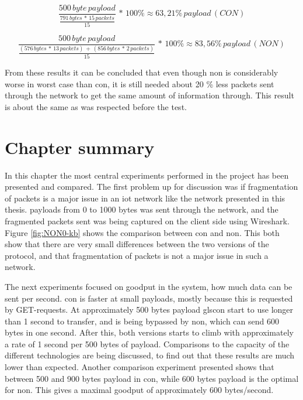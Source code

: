 \begin{equation} \label{bestWorstEquation}
	\frac{500 \, byte \, payload}{\frac{791 \, bytes \,*\, 15 \, packets}{15}}\,*\,100 \% \approx 63,21 \%\, payload \, (CON)
\end{equation}

\begin{equation} \label{bestWorstEquation2}
\frac{500\, byte\, payload}{\frac{(576\, bytes\, *\, 13\, packets)\,+\,(856\, bytes\, *\, 2 \,packets)}{15}}\,*\,100 \% \approx 83,56 \%\, payload \, (NON)
\end{equation}

\noindent From these results it can be concluded that even though \gls{non} is considerably worse in worst case than \gls{con}, it is still needed about 20 \% less packets sent through the network to get the same amount of information through. This result is about the same as was respected before the test. 



\section{Chapter summary}

\noindent In this chapter the most central experiments performed in the project has been presented and compared. The first problem up for discussion was if fragmentation of packets is a major issue in an \gls{iot} network like the network presented in this thesis. \Glspl{payload} from 0 to 1000 bytes was sent through the network, and the fragmented packets sent was being captured on the client side using Wireshark. Figure \ref{fig:NON0-kb} shows the comparison between \gls{con} and \gls{non}. This both show that there are very small differences between the two versions of the protocol, and that fragmentation of packets is not a major issue in such a network. 

\noindent The next experiments focused on \gls{goodput} in the system, how much data can be sent per second. \gls{con} is faster at small \glspl{payload}, mostly because this is requested by GET-requests. At approximately 500 bytes \gls{payload} gls{con} start to use longer than 1 second to transfer, and is being bypassed by \gls{non}, which can send 600 bytes in one second. After this, both versions starts to climb with approximately a rate of 1 second per 500 bytes of \gls{payload}. Comparisons to the capacity of the different technologies are being discussed, to find out that these results are much lower than expected. Another comparison experiment presented shows that between 500 and 900 bytes \gls{payload} in \gls{con}, while 600 bytes \gls{payload} is the optimal for \gls{non}. This gives a maximal \gls{goodput} of approximately 600 bytes/second. 

